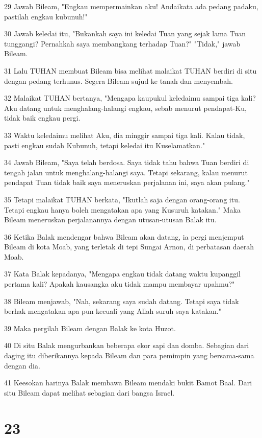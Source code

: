 \par 29 Jawab Bileam, "Engkau mempermainkan aku! Andaikata ada pedang padaku, pastilah engkau kubunuh!"
\par 30 Jawab keledai itu, "Bukankah saya ini keledai Tuan yang sejak lama Tuan tunggangi? Pernahkah saya membangkang terhadap Tuan?" "Tidak," jawab Bileam.
\par 31 Lalu TUHAN membuat Bileam bisa melihat malaikat TUHAN berdiri di situ dengan pedang terhunus. Segera Bileam sujud ke tanah dan menyembah.
\par 32 Malaikat TUHAN bertanya, "Mengapa kaupukul keledaimu sampai tiga kali? Aku datang untuk menghalang-halangi engkau, sebab menurut pendapat-Ku, tidak baik engkau pergi.
\par 33 Waktu keledaimu melihat Aku, dia minggir sampai tiga kali. Kalau tidak, pasti engkau sudah Kubunuh, tetapi keledai itu Kuselamatkan."
\par 34 Jawab Bileam, "Saya telah berdosa. Saya tidak tahu bahwa Tuan berdiri di tengah jalan untuk menghalang-halangi saya. Tetapi sekarang, kalau menurut pendapat Tuan tidak baik saya meneruskan perjalanan ini, saya akan pulang."
\par 35 Tetapi malaikat TUHAN berkata, "Ikutlah saja dengan orang-orang itu. Tetapi engkau hanya boleh mengatakan apa yang Kusuruh katakan." Maka Bileam meneruskan perjalanannya dengan utusan-utusan Balak itu.
\par 36 Ketika Balak mendengar bahwa Bileam akan datang, ia pergi menjemput Bileam di kota Moab, yang terletak di tepi Sungai Arnon, di perbatasan daerah Moab.
\par 37 Kata Balak kepadanya, "Mengapa engkau tidak datang waktu kupanggil pertama kali? Apakah kausangka aku tidak mampu membayar upahmu?"
\par 38 Bileam menjawab, "Nah, sekarang saya sudah datang. Tetapi saya tidak berhak mengatakan apa pun kecuali yang Allah suruh saya katakan."
\par 39 Maka pergilah Bileam dengan Balak ke kota Huzot.
\par 40 Di situ Balak mengurbankan beberapa ekor sapi dan domba. Sebagian dari daging itu diberikannya kepada Bileam dan para pemimpin yang bersama-sama dengan dia.
\par 41 Keesokan harinya Balak membawa Bileam mendaki bukit Bamot Baal. Dari situ Bileam dapat melihat sebagian dari bangsa Israel.

\chapter{23}

